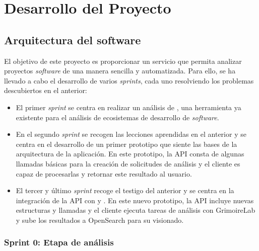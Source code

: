 
\chapter{Desarrollo del Proyecto} %

\label{Chapter3} %


\section{Arquitectura del software}

El objetivo de este proyecto es proporcionar un servicio que permita analizar proyectos \emph{software} de una manera sencilla y automatizada. Para ello, se ha llevado a cabo el desarrollo de varios \emph{sprints}, cada uno resolviendo los problemas descubiertos en el anterior:

\begin{itemize}
    \item El primer \emph{sprint} se centra en realizar un análisis de , una herramienta ya existente para el análisis de ecosistemas de desarrollo de \emph{software}.
    \item En el segundo \emph{sprint} se recogen las lecciones aprendidas en el anterior y se centra en el desarrollo de un primer prototipo que siente las bases de la arquitectura de la aplicación. En este prototipo, la API consta de algunas llamadas básicas para la creación de solicitudes de análisis y el cliente es capaz de procesarlas y retornar este resultado al usuario.
    \item El tercer y último \emph{sprint} recoge el testigo del anterior y se centra en la integración de la API con  y . En este nuevo prototipo, la API incluye nuevas estructuras y llamadas y el cliente ejecuta tareas de análisis con GrimoireLab y sube los resultados a OpenSearch para su visionado.
\end{itemize}

\subsection{Sprint 0: Etapa de análisis}


